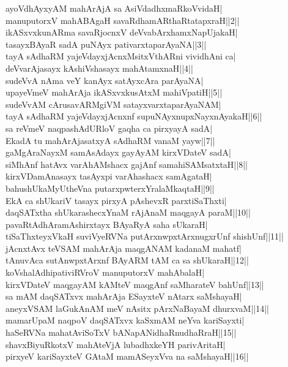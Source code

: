 \documentclass{article}
\begin{document}
ayoVdhAyxyAM mahArAjA sa AsiVdadhxmaRkoVvidaH|\\
manuputorxV mahABAgaH savaRdhamARthaRtatapxraH||2||\\
ikASxvxkunARma savaRjocnxV deVvabArxhamxNapUjakaH|\\
tasayxBAyaR sadA puNAyx pativarxtaparAyaNA||3||\\
tayA sAdhaRM yajeVdayxjAcnxMsitxVthARni vividhAni ca|\\
deVvarAjasayx kAshiVshasayx mahAtamxnaH||4||\\
sudeVvA nAma veY kanAyx satAyxcAra parAyaNA|\\
upayeVmeV mahArAja ikASxvxkusAtxM mahiVpatiH||5||\\
sudeVvAM cArusavARMgiVM satayxvarxtaparAyaNAM|\\
tayA sAdhaRM yajeVdayxjAcnxnf supuNAyxnupxNayxnAyakaH||6||\\
sa reVmeV naqpashAdURloV gaqha ca pirxyayA sadA|\\
EkadA tu mahArAjasatxyA sAdhaRM vanaM yayw||7||\\
gaMgAraNayxM samAsAdayx gayAyAM kirxVDateV sadA|\\
siMhAnf hatAvx varAhAMshacx gajAnf samahiSAMsatxtaH||8||\\
kirxVDamAnasayx tasAyxpi varAhashacx samAgataH|\\
bahushUkaMyUtheVna putarxpwterxYralaMkaqtaH||9||\\
EkA ca shUkariV tasayx pirxyA pAshevxR parxtiSaThxti|\\
daqSATxtha shUkarashecxYnaM rAjAnaM maqgayA paraM||10||\\
pavaRtAdhAramAshirxtayx BAyaRyA saha sUkaraH|\\
tiSaThxteyxVkaH suviVyeRVNa putArxnwpxtArxnugxrUnf shishUnf||11||\\
jAcnxtAvx teVSAM mahArAja maqgANAM kadanaM mahatf|\\
tAnuvAca sutAnwpxtArxnf BAyARM tAM ca sa shUkaraH||12||\\
koVshalAdhipativiRVroV manuputorxV mahAbalaH|\\
kirxVDateV maqgayAM kAMteV maqgAnf saMharateV bahUnf||13||\\
sa mAM daqSATxvx mahArAja ESayxteV nAtarx saMshayaH|\\
aneyxVSAM laGukAnAM meV nAsitx pArxNaBayaM dhurxvaM||14||\\
mamarUpaM naqpoV daqSATxvx kaSxmAM neYva kariSayxti|\\
haSeRVNa mahatAviSoTxV bANapANidhaRnudhaRraH||15||\\
shavxBiyuRkotxV mahAteVjA lubadhxkeYH parivAritaH|\\
pirxyeV kariSayxteV GAtaM mamASeyxVva na saMshayaH||16||\\
\end{document}
